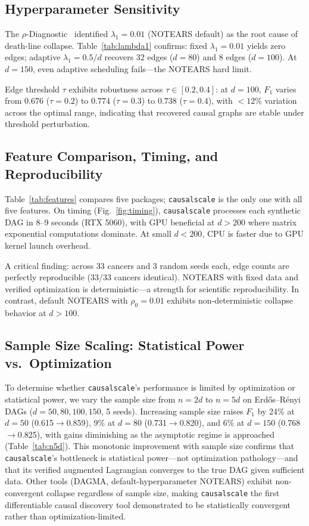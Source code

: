 \documentclass[sigconf,review]{acmart}
\begin{document}
\subsection{Hyperparameter Sensitivity}
The $\rho$-Diagnostic~\cite{gao2025diagnostic} identified $\lambda_1=0.01$ (NOTEARS default) as the root cause of death-line collapse. Table~\ref{tab:lambda1} confirms: fixed $\lambda_1=0.01$ yields zero edges; adaptive $\lambda_1=0.5/d$ recovers 32 edges ($d=80$) and 8 edges ($d=100$). At $d=150$, even adaptive scheduling fails---the NOTEARS hard limit.

Edge threshold $\tau$ exhibits robustness across $\tau\in[0.2,0.4]$: at $d=100$, $F_1$ varies from $0.676$ ($\tau=0.2$) to $0.774$ ($\tau=0.3$) to $0.738$ ($\tau=0.4$), with $<12$\% variation across the optimal range, indicating that recovered causal graphs are stable under threshold perturbation.

\subsection{Feature Comparison, Timing, and Reproducibility}
Table~\ref{tab:features} compares five packages; \texttt{causalscale} is the only one with all five features. On timing (Fig.~\ref{fig:timing}), \texttt{causalscale} processes each synthetic DAG in 8--9 seconds (RTX 5060), with GPU beneficial at $d>200$ where matrix exponential computations dominate. At small $d<200$, CPU is faster due to GPU kernel launch overhead.

A critical finding: across 33 cancers and 3 random seeds each, edge counts are perfectly reproducible (33/33 cancers identical). NOTEARS with fixed data and verified optimization is deterministic---a strength for scientific reproducibility. In contrast, default NOTEARS with $\rho_0=0.01$ exhibits non-deterministic collapse behavior at $d>100$.

\subsection{Sample Size Scaling: Statistical Power vs.\ Optimization}

To determine whether \texttt{causalscale}'s performance is limited by optimization or statistical power, we vary the sample size from $n=2d$ to $n=5d$ on Erd\H{o}s--R\'{e}nyi DAGs ($d=50,80,100,150$, 5 seeds). Increasing sample size raises $F_1$ by 24\% at $d=50$ (0.615$\to$0.859), 9\% at $d=80$ (0.731$\to$0.820), and 6\% at $d=150$ (0.768$\to$0.825), with gains diminishing as the asymptotic regime is approached (Table~\ref{tab:n5d}). This monotonic improvement with sample size confirms that \texttt{causalscale}'s bottleneck is statistical power---not optimization pathology---and that its verified augmented Lagrangian converges to the true DAG given sufficient data. Other tools (DAGMA, default-hyperparameter NOTEARS) exhibit non-convergent collapse regardless of sample size, making \texttt{causalscale} the first differentiable causal discovery tool demonstrated to be statistically convergent rather than optimization-limited.
\end{document}
